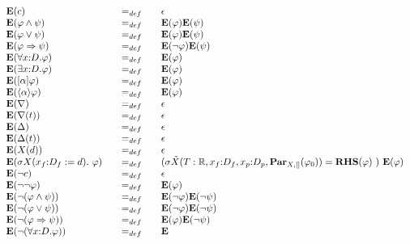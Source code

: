 \documentclass{article}
\begin{document}
\begin{equation*}
\begin{array}{lll}
{\mathbf{E}}(c) & =_{def} & \epsilon \\ 
{\mathbf{E}}(\varphi \wedge \psi ) & =_{def} & {\mathbf{E}}(\varphi ){%
\mathbf{E}}(\psi ) \\ 
{\mathbf{E}}(\varphi \vee \psi ) & =_{def} & {\mathbf{E}}(\varphi ){\mathbf{E%
}}(\psi ) \\ 
{\mathbf{E}}(\varphi \Rightarrow \psi ) & =_{def} & {\mathbf{E}}(\lnot
\varphi ){\mathbf{E}}(\psi ) \\ 
{\mathbf{E}}(\forall {x{:}D}.\varphi ) & =_{def} & {\mathbf{E}}(\varphi ) \\ 
{\mathbf{E}}(\exists {x{:}D}.\varphi ) & =_{def} & {\mathbf{E}}(\varphi ) \\ 
{\mathbf{E}}([\alpha ]\varphi ) & =_{def} & {\mathbf{E}}(\varphi ) \\ 
{\mathbf{E}}(\langle \alpha \rangle \varphi ) & =_{def} & {\mathbf{E}}%
(\varphi ) \\ 
{\mathbf{E}}(\nabla ) & =_{def} & \epsilon \\ 
{\mathbf{E}}(\nabla (t)) & =_{def} & \epsilon \\ 
{\mathbf{E}}(\Delta ) & =_{def} & \epsilon \\ 
{\mathbf{E}}(\Delta (t)) & =_{def} & \epsilon \\ 
{\mathbf{E}}(X(d)) & =_{def} & \epsilon \\ 
{\mathbf{E}}(\sigma X(x_{f}{:}D_{f}:=d).~\varphi )~~~ & =_{def}~~~ & (\sigma 
\tilde{X}(T:\mathbb{R},x_{f}{:}D_{f},x_{p}{:}D_{p},\mathbf{Par}%
_{X,[]}(\varphi _{0}))={\mathbf{RHS}}(\varphi )~)~{\mathbf{E}}(\varphi ) \\ 
{\mathbf{E}}(\lnot c) & =_{def} & \epsilon \\ 
{\mathbf{E}}(\lnot \lnot \varphi ) & =_{def} & {\mathbf{E}}(\varphi ) \\ 
{\mathbf{E}}(\lnot (\varphi \wedge \psi )) & =_{def} & {\mathbf{E}}(\lnot
\varphi ){\mathbf{E}}(\lnot \psi ) \\ 
{\mathbf{E}}(\lnot (\varphi \vee \psi )) & =_{def} & {\mathbf{E}}(\lnot
\varphi ){\mathbf{E}}(\lnot \psi ) \\ 
{\mathbf{E}}(\lnot (\varphi \Rightarrow \psi )) & =_{def} & {\mathbf{E}}%
(\varphi ){\mathbf{E}}(\lnot \psi ) \\ 
{\mathbf{E}}(\lnot (\forall {x{:}D}.\varphi )) & =_{def} & {\mathbf{E}}%

\end{array}
\end{equation*}
\end{document}
